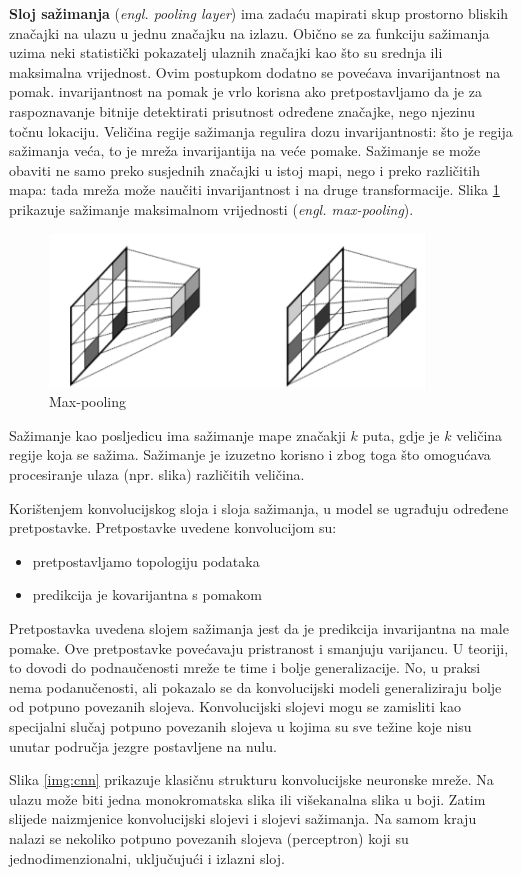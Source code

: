 \par \bigbreak
\textbf{Sloj sažimanja} (\textit{engl. pooling layer}) ima zadaću mapirati skup prostorno bliskih značajki na ulazu u jednu značajku na izlazu. Obično se za funkciju sažimanja uzima neki statistički pokazatelj ulaznih značajki kao što su srednja ili maksimalna vrijednost. Ovim postupkom dodatno se povećava invarijantnost na pomak. invarijantnost na pomak je vrlo korisna ako pretpostavljamo da je za raspoznavanje bitnije detektirati prisutnost određene značajke, nego njezinu točnu lokaciju. Veličina regije sažimanja regulira dozu invarijantnosti: što je regija sažimanja veća, to je mreža invarijantija na veće pomake. Sažimanje se može obaviti ne samo preko susjednih značajki u istoj mapi, nego i preko različitih mapa: tada mreža može naučiti invarijantnost i na druge transformacije. Slika \ref{img:pooling} prikazuje sažimanje maksimalnom vrijednosti (\textit{engl. max-pooling}). 

\begin{figure}[htb]
\centering
\includegraphics[width=10cm]{img/Pooling.png}
\caption{Max-pooling}
\label{img:pooling}
\end{figure}
Sažimanje kao posljedicu ima sažimanje mape značakji $k$ puta, gdje je $k$ veličina regije koja se sažima. Sažimanje je izuzetno korisno i zbog toga što omogućava procesiranje ulaza (npr. slika) različitih veličina. 

Korištenjem konvolucijskog sloja i sloja sažimanja, u model se ugrađuju određene pretpostavke. Pretpostavke uvedene konvolucijom su:
\begin{itemize}
\item pretpostavljamo topologiju podataka
\item predikcija je kovarijantna s pomakom
\end{itemize}
Pretpostavka uvedena slojem sažimanja jest da je predikcija invarijantna na male pomake. Ove pretpostavke povećavaju pristranost i smanjuju varijancu. U teoriji, to dovodi do podnaučenosti mreže te time i bolje generalizacije. No, u praksi nema podanučenosti, ali pokazalo se da konvolucijski modeli generaliziraju bolje od potpuno povezanih slojeva. Konvolucijski slojevi mogu se zamisliti kao specijalni slučaj potpuno povezanih slojeva u kojima su sve težine koje nisu unutar područja jezgre postavljene na nulu. 

Slika \ref{img:cnn} prikazuje klasičnu strukturu konvolucijske neuronske mreže.  Na ulazu može biti jedna monokromatska slika ili višekanalna slika u boji. Zatim slijede naizmjenice konvolucijski slojevi i slojevi sažimanja.  Na samom kraju nalazi se nekoliko potpuno povezanih slojeva (perceptron) koji su jednodimenzionalni, uključujući i izlazni sloj.


